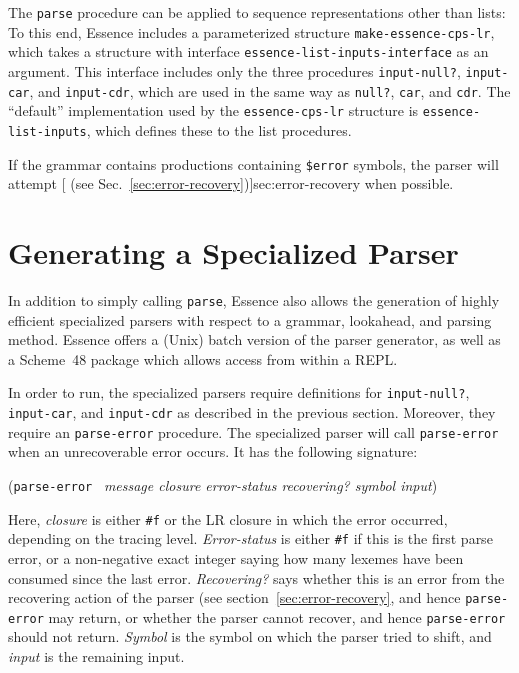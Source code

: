 \documentclass{article}
\renewcommand{\var}[1]{\noindent\mbox{\textit{#1}}}
\newcommand{\pproto}[2]{\unskip%
\mbox{\texonly{\spaceskip=0.5em}#1}%
\mbox{ }\texonly{\nobreak}\htmlonly{ }\textrm{#2}}
\newcommand{\proto}[3]{\par\bigskip\begin{flushleft}\pproto{(\texttt{#1}}{\textit{#2})}\hspace*{\fill}{#3}\end{flushleft}}
\newcommand{\codefont}[1]{\texttt{#1}}
\begin{document}
The \codefont{parse} procedure can be applied to sequence
representations other than lists: To this end, Essence includes a
parameterized structure \codefont{make-essence-cps-lr}, which takes a
structure with interface \codefont{essence-list-inputs-interface} as
an argument.  This interface includes only the three procedures
\codefont{input-null?}, \codefont{input-car}, and
\codefont{input-cdr}, which are used in the same way as
\codefont{null?}, \codefont{car}, and \codefont{cdr}.   The
``default'' implementation used by the \codefont{essence-cps-lr} structure
is \codefont{essence-list-inputs}, which defines these to the list
procedures.

If the grammar contains productions containing \codefont{\$error}
symbols, the parser will attempt [ (see
Sec.~\ref{sec:error-recovery})]{sec:error-recovery} when possible.

\section{Generating a Specialized Parser}
\label{sec:parser-generation}

In addition to simply calling \codefont{parse}, Essence also allows
the generation of highly efficient specialized parsers with respect to
a grammar, lookahead, and parsing method.  Essence offers a (Unix)
batch version of the parser generator, as well as a Scheme~48 package
which allows access from within a REPL.

In order to run, the specialized parsers require definitions for
\codefont{input-null?}, \codefont{input-car}, and \codefont{input-cdr}
as described in the previous section.  Moreover, they require an
\codefont{parse-error} procedure.  The specialized parser will call
\codefont{parse-error} when an unrecoverable error occurs.  It has the
following signature:

\proto{parse-error}{message closure error-status recovering? symbol input}{procedure}
%
Here, \var{closure} is either \verb|#f| or the LR closure in which the
error occurred, depending on the tracing level.  \var{Error-status} is
either \verb|#f| if this is the first parse error, or a non-negative
exact integer saying how many lexemes have been consumed since the
last error.  \var{Recovering?} says whether this is an error from the
recovering action of the parser (see section~\ref{sec:error-recovery},
and hence \codefont{parse-error} may return, or whether the parser
cannot recover, and hence \codefont{parse-error} should not return.
\var{Symbol} is the symbol on which the parser tried to shift, and
\var{input} is the remaining input.
\end{document}
